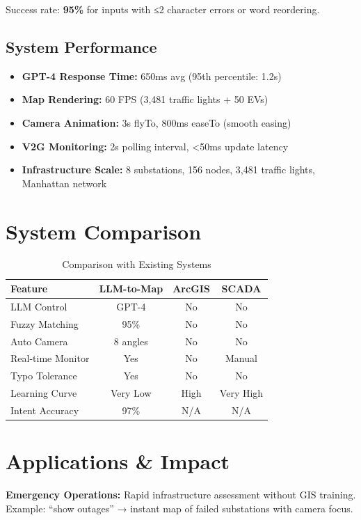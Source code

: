 \documentclass[sigconf]{acmart}
\begin{document}
Success rate: \textbf{95\%} for inputs with ≤2 character errors or word reordering.

\subsection{System Performance}

\begin{itemize}
    \item \textbf{GPT-4 Response Time:} 650ms avg (95th percentile: 1.2s)
    \item \textbf{Map Rendering:} 60 FPS (3,481 traffic lights + 50 EVs)
    \item \textbf{Camera Animation:} 3s flyTo, 800ms easeTo (smooth easing)
    \item \textbf{V2G Monitoring:} 2s polling interval, <50ms update latency
    \item \textbf{Infrastructure Scale:} 8 substations, 156 nodes, 3,481 traffic lights, Manhattan network
\end{itemize}

\section{System Comparison}

\begin{table}[h]
\centering
\caption{Comparison with Existing Systems}
\begin{tabular}{lccc}
\toprule
\textbf{Feature} & \textbf{LLM-to-Map} & \textbf{ArcGIS} & \textbf{SCADA} \\
\midrule
LLM Control & GPT-4 & No & No \\
Fuzzy Matching & 95\% & No & No \\
Auto Camera & 8 angles & No & No \\
Real-time Monitor & Yes & No & Manual \\
Typo Tolerance & Yes & No & No \\
Learning Curve & Very Low & High & Very High \\
Intent Accuracy & 97\% & N/A & N/A \\
\bottomrule
\end{tabular}
\end{table}

\section{Applications \& Impact}

\textbf{Emergency Operations:} Rapid infrastructure assessment without GIS training. Example: ``show outages'' → instant map of failed substations with camera focus.
\end{document}
